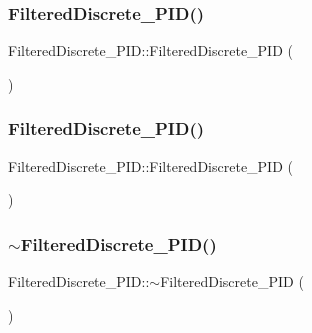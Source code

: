 \subsubsection{\texorpdfstring{FilteredDiscrete\_PID()}{FilteredDiscrete\_PID()}\hspace{0.1cm}{\footnotesize\ttfamily [3/4]}}
{\footnotesize\ttfamily Filtered\+Discrete\+\_\+\+P\+I\+D\+::\+Filtered\+Discrete\+\_\+\+P\+ID (\begin{DoxyParamCaption}\item[{\mbox{\hyperlink{class_filtered_discrete___p_i_d}{Filtered\+Discrete\+\_\+\+P\+ID}} \&\&}]{ }\end{DoxyParamCaption})\hspace{0.3cm}{\ttfamily [default]}}

\mbox{\label{class_filtered_discrete___p_i_d_aad43f3393dfc04f64fd920cacc39e3ba}} 
\subsubsection{\texorpdfstring{FilteredDiscrete\_PID()}{FilteredDiscrete\_PID()}\hspace{0.1cm}{\footnotesize\ttfamily [4/4]}}
{\footnotesize\ttfamily Filtered\+Discrete\+\_\+\+P\+I\+D\+::\+Filtered\+Discrete\+\_\+\+P\+ID (\begin{DoxyParamCaption}\item[{const \mbox{\hyperlink{class_filtered_discrete___p_i_d}{Filtered\+Discrete\+\_\+\+P\+ID}} \&}]{ }\end{DoxyParamCaption})\hspace{0.3cm}{\ttfamily [default]}}

\mbox{\label{class_filtered_discrete___p_i_d_a5ce4abb18462ab922dc4180eb1b1dedc}} 
\subsubsection{\texorpdfstring{$\sim$FilteredDiscrete\_PID()}{~FilteredDiscrete\_PID()}}
{\footnotesize\ttfamily Filtered\+Discrete\+\_\+\+P\+I\+D\+::$\sim$\+Filtered\+Discrete\+\_\+\+P\+ID (\begin{DoxyParamCaption}{ }\end{DoxyParamCaption})\hspace{0.3cm}{\ttfamily [inline]}}



